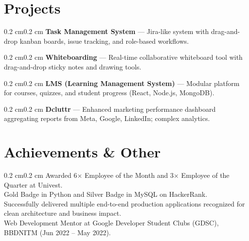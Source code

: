 \documentclass[10pt, letterpaper]{article}
\newenvironment{onecolentry}{\begin{adjustwidth}{0.2 cm}{0.2 cm}\linespread{1.2}\selectfont}{\end{adjustwidth}}
\let\hrefWithoutArrow\href
\renewcommand{\href}[2]{\hrefWithoutArrow{#1}{\ifthenelse{\equal{#2}{}}{ }{#2 }\raisebox{.15ex}{\footnotesize \faExternalLink*}}}
\begin{document}
\section{Projects}
\begin{onecolentry}
\textbf{Task Management System} — \href{https://jira.cvasingh.com}{}
Jira-like system with drag-and-drop kanban boards, issue tracking, and role-based workflows.
\end{onecolentry}
\begin{onecolentry}
\textbf{Whiteboarding} — \href{https://white-board.cvasingh.com}{}
Real-time collaborative whiteboard tool with drag-and-drop sticky notes and drawing tools.
\end{onecolentry}
\begin{onecolentry}
\textbf{LMS (Learning Management System)} — \href{https://lms.cvasingh.com}{}
Modular platform for courses, quizzes, and student progress (React, Node.js, MongoDB).
\end{onecolentry}
\begin{onecolentry}
\textbf{Dcluttr} — \href{https://app.dcluttr.ai}{}
Enhanced marketing performance dashboard aggregating reports from Meta, Google, LinkedIn; complex analytics.
\end{onecolentry}

\section{Achievements \& Other}
\begin{onecolentry}
Awarded 6× Employee of the Month and 3× Employee of the Quarter at Univest.\\
Gold Badge in Python and Silver Badge in MySQL on HackerRank.\\
Successfully delivered multiple end-to-end production applications recognized for clean architecture and business impact.\\
Web Development Mentor at Google Developer Student Clubs (GDSC), BBDNITM (Jun 2022 – May 2022).
\end{onecolentry}
\end{document}
